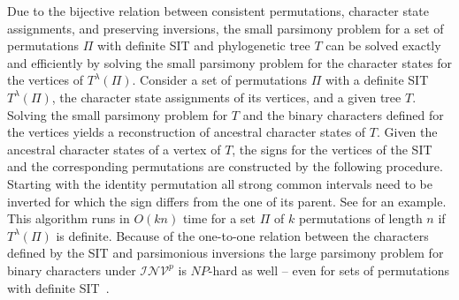 \documentclass{svmult}
\newcommand{\MB}[2]{{\textcolor{gray}{#1}}\textcolor{blue}{#2}}
\newcommand{\m}[1]{\mathcal{#1}}
\begin{document}
Due to the bijective relation between consistent permutations, character state
assignments, and preserving inversions, the small parsimony problem for a set of
permutations $\Pi$ with definite SIT and phylogenetic tree $T$ can be solved exactly and 
efficiently by solving the small parsimony problem for the character states
for the vertices of ${T}^\lambda(\Pi)$.
%
%
Consider a set of permutations $\Pi$ with a definite SIT ${T}^\lambda(\Pi)$,
the character state assignments of its vertices, and a given tree $T$.
Solving the small parsimony problem for $T$ and the binary characters defined
for the vertices yields a reconstruction of ancestral character states of $T$.
%
Given the ancestral character states of a vertex of $T$, the signs for the
vertices of the SIT and the corresponding permutations are constructed by the
following procedure.
%
Starting with the identity permutation all strong common intervals need to be inverted 
for which the sign differs from the one of its parent. 
%
See  for an example.
% 
This algorithm runs in $O(kn)$ time for a set $\Pi$ of $k$ permutations of
length $n$ if ${T}^\lambda(\Pi)$ is definite.
%
Because of the one-to-one relation between the characters defined by the SIT and 
parsimonious inversions the large parsimony problem for binary characters 
under $\m{INV}^p$ is $NP$-hard as well -- 
even for sets of permutations with definite SIT~\cite{Bernt_2012}.
%
\end{document}
